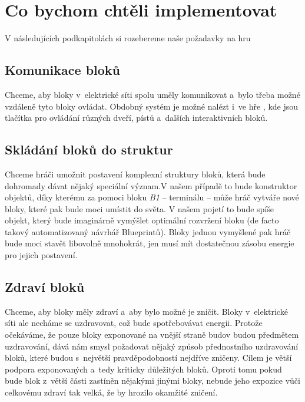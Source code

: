 


\section{Co bychom chtěli implementovat}

V následujících podkapitolách si rozebereme naše požadavky na hru






\subsection{Komunikace bloků}

Chceme, aby bloky v~elektrické síti spolu uměly komunikovat a~bylo třeba možné vzdáleně tyto bloky ovládat. Obdobný systém je možné nalézt i~ve hře \SE{}, kde jsou tlačítka pro ovládání různých dveří, pístů a~dalších interaktivních bloků.

\subsection{Skládání bloků do struktur}

Chceme hráči umožnit postavení komplexní struktury bloků, která bude dohromady dávat nějaký speciální význam.V našem případě to bude konstruktor objektů, díky kterému za pomoci bloku \textit{B1} -- terminálu -- může hráč vytváře nové bloky, které pak bude moci umístit do světa. V našem pojetí to bude spíše objekt, který bude imaginárně vymýšlet optimální rozvržení bloku (de facto takový automatizovaný návrhář Blueprintů). Bloky jednou vymyšlené pak hráč bude moci stavět libovolně mnohokrát, jen musí mít dostatečnou zásobu energie pro jejich postavení.

\subsection{Zdraví bloků}
Chceme, aby bloky měly zdraví a~aby bylo možné je zničit. Bloky v~elektrické síti ale necháme se uzdravovat, což bude spotřebovávat energii. Protože očekáváme, že pouze bloky exponované na vnější straně budov budou předmětem uzdravování, dává nám smysl požadovat nějaký způsob přednostního uzdravování bloků, které budou s~největší pravděpodobností nejdříve zničeny. Cílem je větší podpora exponovaných a~tedy kriticky důležitých bloků. Oproti tomu pokud bude blok z~větší části zastíněn nějakými jinými bloky, nebude jeho expozice vůči celkovému zdraví tak velká, že by hrozilo okamžité zničení.

